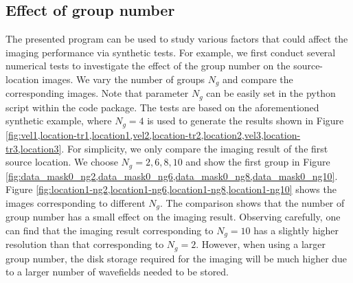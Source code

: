 \subsection{Effect of group number}
The presented program can be used to study various factors that could affect the imaging performance via synthetic tests. For example, we first conduct several numerical tests to investigate the effect of the group number on the source-location images. We vary the number of groups $N_g$ and compare the corresponding images. Note that parameter $N_g$ can be easily set in the python script within the code package. The tests are based on the aforementioned synthetic example, where $N_g=4$ is used to generate the results shown in Figure \ref{fig:vel1,location-tr1,location1,vel2,location-tr2,location2,vel3,location-tr3,location3}. For simplicity, we only compare the imaging result of the first source location. We choose $N_g=2,6,8,10$ and show the first group in Figure \ref{fig:data_mask0_ng2,data_mask0_ng6,data_mask0_ng8,data_mask0_ng10}. Figure \ref{fig:location1-ng2,location1-ng6,location1-ng8,location1-ng10} shows the images corresponding to different $N_g$. The comparison shows that the number of group number has a small effect on the imaging result. Observing carefully, one can find that the imaging result corresponding to $N_g=10$ has a slightly higher resolution than that corresponding to $N_g=2$. However, when using a larger group number, the disk storage required for the imaging will be much higher due to a larger number of wavefields needed to be stored. 

